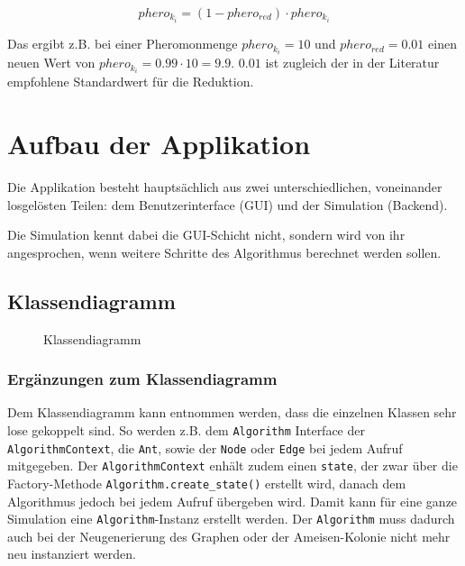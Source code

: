 \[ phero_{k_i} = (1 - phero_{red}) \cdot phero_{k_i} \]

\noindent
Das ergibt z.B. bei einer Pheromonmenge $phero_{k_i} = 10$ und $phero_{red} = 0.01$ einen neuen Wert von $phero_{k_i} = 0.99 \cdot 10 = 9.9$. $0.01$ ist zugleich der in der Literatur empfohlene Standardwert für die Reduktion.

\section{Aufbau der Applikation}

Die Applikation besteht hauptsächlich aus zwei unterschiedlichen, voneinander losgelösten Teilen: dem Benutzerinterface (GUI) und der Simulation (Backend).

Die Simulation kennt dabei die GUI-Schicht nicht, sondern wird von ihr angesprochen, wenn weitere Schritte des Algorithmus berechnet werden sollen.

\pagebreak
\subsection{Klassendiagramm}

\begin{figure}[h]
    \centering
    \caption{Klassendiagramm}
\end{figure}

\pagebreak
\subsubsection*{Ergänzungen zum Klassendiagramm}

Dem Klassendiagramm kann entnommen werden, dass die einzelnen Klassen sehr lose gekoppelt sind. So werden z.B. dem \texttt{Algorithm} Interface der \texttt{AlgorithmContext}, die \texttt{Ant}, sowie der \texttt{Node} oder \texttt{Edge} bei jedem Aufruf mitgegeben. Der \texttt{AlgorithmContext} enhält zudem einen \texttt{state}, der zwar über die Factory-Methode \texttt{Algorithm.create\_state()} erstellt wird, danach dem Algorithmus jedoch bei jedem Aufruf übergeben wird. Damit kann für eine ganze Simulation eine \texttt{Algorithm}-Instanz erstellt werden. Der \texttt{Algorithm} muss dadurch auch bei der Neugenerierung des Graphen oder der Ameisen-Kolonie nicht mehr neu instanziert werden.

